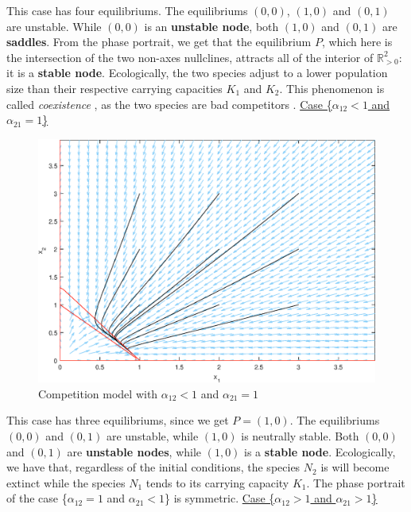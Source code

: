 \documentclass[11pt,a4paper]{scrartcl}
\theoremstyle{definition}
\begin{document}
This case has four equilibriums. The equilibriums $(0, 0)$, $(1, 0)$ and $(0, 1)$ are unstable. While $(0, 0)$ is an \textbf{unstable node}, both $(1, 0)$ and $(0, 1)$ are \textbf{saddles}. From the phase portrait, we get that the equilibrium $P$, which here is the intersection of the two non-axes nullclines, attracts all of the interior of $\mathbb{R}_{>0}^2$: it is a \textbf{stable node}. Ecologically, the two species adjust to a lower population size than their respective carrying capacities $K_1$ and $K_2$. This phenomenon is called \textit{coexistence} , as the two species are bad competitors \cite{Murray}.
\FloatBarrier
\vspace{1em}
\underline {Case \Big\{$\alpha_{12} < 1$ and $\alpha_{21} = 1$\Big\}}\newline

\begin{figure}[!ht]
\centering
\includegraphics[scale=.6]{fig_2.eps}
\caption{Competition model with $\alpha_{12} < 1$ and $\alpha_{21} = 1$}
\label{figC2}
\end{figure} 

This case has three equilibriums, since we get $P=(1, 0)$. The equilibriums $(0, 0)$ and $(0, 1)$ are unstable, while $(1, 0)$ is neutrally stable. Both $(0, 0)$ and $(0, 1)$ are \textbf{unstable nodes}, while $(1, 0)$ is a \textbf{stable node}. Ecologically, we have that, regardless of the initial conditions, the species $N_2$ is will become extinct while the species $N_1$ tends to its carrying capacity $K_1$. The phase portrait of the case \Big\{$\alpha_{12} = 1$ and $\alpha_{21} < 1$\Big\} is symmetric.
\FloatBarrier
\vspace{1em}
\underline{Case \Big\{$\alpha_{12} > 1$ and $\alpha_{21} > 1$\Big\}}\newline
\end{document}
